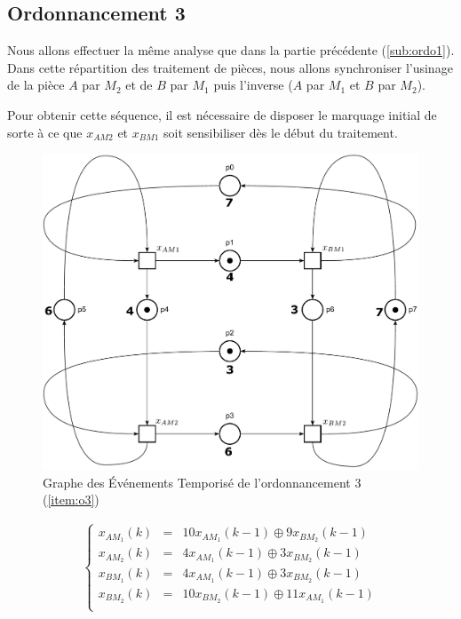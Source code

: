 \subsection{Ordonnancement 3}
Nous allons effectuer la même analyse que dans la partie précédente (\ref{sub:ordo1}). Dans cette répartition des traitement de pièces, nous allons synchroniser l'usinage de la pièce $A$ par $M_2$ et de $B$ par $M_1$ puis l'inverse ($A$ par $M_1$ et $B$ par $M_2$). 

Pour obtenir cette séquence, il est nécessaire de disposer le marquage initial de sorte à ce que $x_{AM2}$ et $x_{BM1}$ soit sensibiliser dès le début du traitement.
\begin{figure}[!ht]
\centering
\includegraphics[width = \textwidth]{./II/images/GET_3.pdf}
\caption{\label{fig:get} Graphe des Événements Temporisé de l'ordonnancement 3 (\ref{item:o3})}
\end{figure}
\begin{align*}%
\left\lbrace
\begin{array}{lcl}
x_{AM_1}(k)&=& 10x_{AM_1}(k-1) \oplus  9x_{BM_2}(k-1)\\
x_{AM_2}(k)&=&  4x_{AM_1}(k-1) \oplus  3x_{BM_2}(k-1)\\
x_{BM_1}(k)&=&  4x_{AM_1}(k-1) \oplus  3x_{BM_2}(k-1)\\
x_{BM_2}(k)&=& 10x_{BM_2}(k-1) \oplus 11x_{AM_1}(k-1)\\
\end{array}
\right.
\end{align*}
